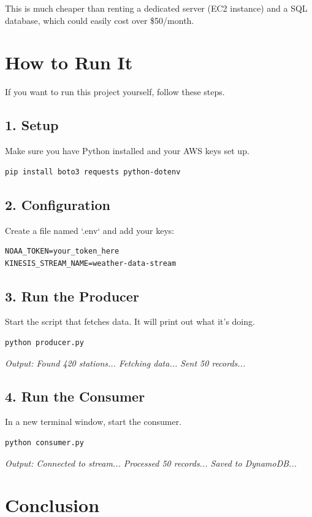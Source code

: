 \documentclass[12pt, a4paper]{article}
\begin{document}
This is much cheaper than renting a dedicated server (EC2 instance) and a SQL database, which could easily cost over \$50/month.

\section{How to Run It}

If you want to run this project yourself, follow these steps.

\subsection{1. Setup}
Make sure you have Python installed and your AWS keys set up.
\begin{verbatim}
pip install boto3 requests python-dotenv
\end{verbatim}

\subsection{2. Configuration}
Create a file named `.env` and add your keys:
\begin{verbatim}
NOAA_TOKEN=your_token_here
KINESIS_STREAM_NAME=weather-data-stream
\end{verbatim}

\subsection{3. Run the Producer}
Start the script that fetches data. It will print out what it's doing.
\begin{verbatim}
python producer.py
\end{verbatim}
\textit{Output: Found 420 stations... Fetching data... Sent 50 records...}

\subsection{4. Run the Consumer}
In a new terminal window, start the consumer.
\begin{verbatim}
python consumer.py
\end{verbatim}
\textit{Output: Connected to stream... Processed 50 records... Saved to DynamoDB...}

\section{Conclusion}
\end{document}
